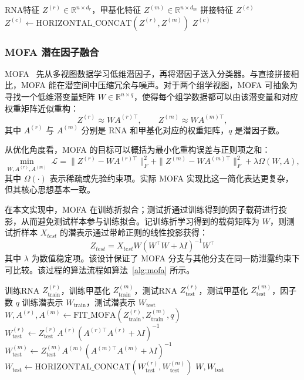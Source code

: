 \begin{algorithm}[H]
\caption{Concat早期融合算法}
\label{alg:concat}
\begin{algorithmic}[1]
\Require RNA特征 $Z^{(r)} \in \mathbb{R}^{n \times d_r}$，甲基化特征 $Z^{(m)} \in \mathbb{R}^{n \times d_m}$
\Ensure 拼接特征 $Z^{(c)}$
\State $Z^{(c)} \gets \text{HORIZONTAL\_CONCAT}(Z^{(r)}, Z^{(m)})$
\State \Return $Z^{(c)}$
\end{algorithmic}
\end{algorithm}

\subsubsection{MOFA 潜在因子融合}

MOFA~\cite{mofa2018} 先从多视图数据学习低维潜因子，再将潜因子送入分类器。与直接拼接相比，MOFA 能在潜空间中压缩冗余与噪声。对于两个组学视图，MOFA 可抽象为寻找一个低维潜变量矩阵 $W \in \mathbb{R}^{n \times q}$，使得每个组学数据都可以由该潜变量和对应权重矩阵近似重构：
\[
Z^{(r)} \approx W A^{(r)\top}, \qquad Z^{(m)} \approx W A^{(m)\top},
\]
其中 $A^{(r)}$ 与 $A^{(m)}$ 分别是 RNA 和甲基化对应的权重矩阵，$q$ 是潜因子数。

从优化角度看，MOFA 的目标可以概括为最小化重构误差与正则项之和：
\[
\min_{W, A^{(r)}, A^{(m)}} \; \mathcal{L} = \|Z^{(r)} - W A^{(r)\top}\|_F^2 + \|Z^{(m)} - W A^{(m)\top}\|_F^2 + \lambda \Omega(W, A),
\]
其中 $\Omega(\cdot)$ 表示稀疏或先验约束项。实际 MOFA 实现比这一简化表达更复杂，但其核心思想基本一致。

在本文实现中，MOFA 在训练折拟合；测试折通过训练得到的因子载荷进行投影，从而避免测试样本参与训练拟合。记训练折学习得到的载荷矩阵为 $W$，则测试折样本 $X_{test}$ 的潜表示通过带岭正则的线性投影获得：
\[
Z_{test}=X_{test}W(W^\top W+\lambda I)^{-1}W^\top
\]
其中 $\lambda$ 为数值稳定项。该设计保证了 MOFA 分支与其他分支在同一防泄露约束下可比较。该过程的算法流程如算法~\ref{alg:mofa} 所示。

\begin{algorithm}[H]
\caption{MOFA潜在因子融合算法}
\label{alg:mofa}
\begin{algorithmic}[1]
\Require 训练RNA $Z^{(r)}_{\text{train}}$，训练甲基化 $Z^{(m)}_{\text{train}}$，测试RNA $Z^{(r)}_{\text{test}}$，测试甲基化 $Z^{(m)}_{\text{test}}$，因子数 $q$
\Ensure 训练潜表示 $W_{\text{train}}$，测试潜表示 $W_{\text{test}}$
\State $W, A^{(r)}, A^{(m)} \gets \text{FIT\_MOFA}(Z^{(r)}_{\text{train}}, Z^{(m)}_{\text{train}}, q)$
\State $W^{(r)}_{\text{test}} \gets Z^{(r)}_{\text{test}} A^{(r)} (A^{(r)\top} A^{(r)} + \lambda I)^{-1}$ 
\State $W^{(m)}_{\text{test}} \gets Z^{(m)}_{\text{test}} A^{(m)} (A^{(m)\top} A^{(m)} + \lambda I)^{-1}$ 
\State $W_{\text{test}} \gets \text{HORIZONTAL\_CONCAT}(W^{(r)}_{\text{test}}, W^{(m)}_{\text{test}})$
\State \Return $W, W_{\text{test}}$
\end{algorithmic}
\end{algorithm}

